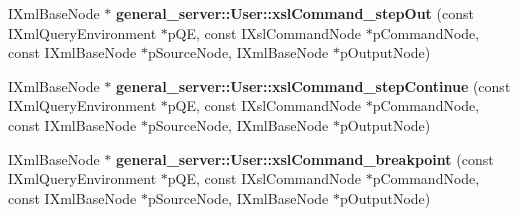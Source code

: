 \begin{DoxyCompactItemize}
\item 
\hypertarget{group__XSLModule-Commands_gabd888deeae820436366d439244d2c80a}{\-I\-Xml\-Base\-Node $\ast$ {\bfseries general\-\_\-server\-::\-User\-::xsl\-Command\-\_\-step\-Out} (const \-I\-Xml\-Query\-Environment $\ast$p\-Q\-E, const \-I\-Xsl\-Command\-Node $\ast$p\-Command\-Node, const \-I\-Xml\-Base\-Node $\ast$p\-Source\-Node, \-I\-Xml\-Base\-Node $\ast$p\-Output\-Node)}\label{group__XSLModule-Commands_gabd888deeae820436366d439244d2c80a}

\item 
\hypertarget{group__XSLModule-Commands_gace9c3d1665364d34292c051a083e79c9}{\-I\-Xml\-Base\-Node $\ast$ {\bfseries general\-\_\-server\-::\-User\-::xsl\-Command\-\_\-step\-Continue} (const \-I\-Xml\-Query\-Environment $\ast$p\-Q\-E, const \-I\-Xsl\-Command\-Node $\ast$p\-Command\-Node, const \-I\-Xml\-Base\-Node $\ast$p\-Source\-Node, \-I\-Xml\-Base\-Node $\ast$p\-Output\-Node)}\label{group__XSLModule-Commands_gace9c3d1665364d34292c051a083e79c9}

\item 
\hypertarget{group__XSLModule-Commands_ga9b487cde62c4395e1fc1646ad053627c}{\-I\-Xml\-Base\-Node $\ast$ {\bfseries general\-\_\-server\-::\-User\-::xsl\-Command\-\_\-breakpoint} (const \-I\-Xml\-Query\-Environment $\ast$p\-Q\-E, const \-I\-Xsl\-Command\-Node $\ast$p\-Command\-Node, const \-I\-Xml\-Base\-Node $\ast$p\-Source\-Node, \-I\-Xml\-Base\-Node $\ast$p\-Output\-Node)}\label{group__XSLModule-Commands_ga9b487cde62c4395e1fc1646ad053627c}

\end{DoxyCompactItemize}

